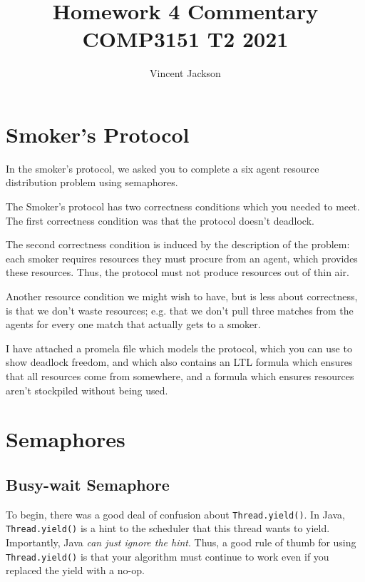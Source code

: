 \documentclass{article}
\begin{document}
\title{Homework 4 Commentary \\ COMP3151 T2 2021}
\author{Vincent Jackson}
\maketitle

\section{Smoker's Protocol}

In the smoker's protocol, we asked you to complete
a six agent resource distribution problem using semaphores.

The Smoker's protocol has two correctness conditions which you needed to meet.
The first correctness condition was that the protocol doesn't deadlock.

The second correctness condition is induced by the description of the problem:
each smoker requires resources they must procure from an agent,
which provides these resources.
Thus, the protocol must not produce resources out of thin air.

Another resource condition we might wish to have, but is less about correctness,
is that we don't waste resources;
e.g. that we don't pull three matches from the agents
for every one match that actually gets to a smoker.

I have attached a promela file which models the protocol, which you can use
to show deadlock freedom, and which also contains an LTL formula which ensures
that all resources come from somewhere, and a formula which ensures resources
aren't stockpiled without being used.

\section{Semaphores}

\subsection{Busy-wait Semaphore}

To begin, there was a good deal of confusion about \texttt{Thread.yield()}.
In Java, \texttt{Thread.yield()} is a hint to the scheduler that this
thread wants to yield. Importantly, Java \emph{can just ignore the hint}.
Thus, a good rule of thumb for using \texttt{Thread.yield()} is that your algorithm
must continue to work even if you replaced the yield with a no-op.
\end{document}
